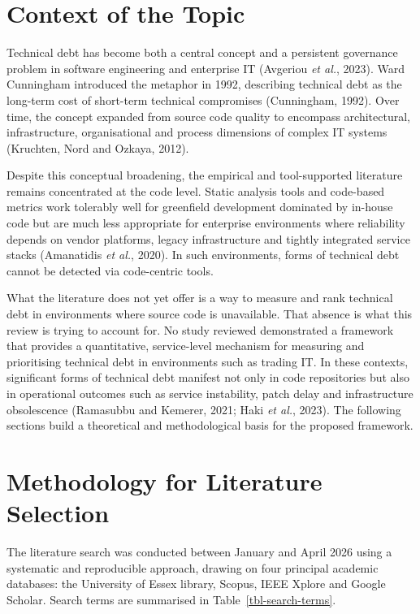 \documentclass[
  12pt,
  letterpaper,
  12pt,
  oneside,
  english,
  onehalfspacing,
  headsepline]{MastersDoctoralThesis}
\begin{document}
\section{Context of the Topic}\label{context-of-the-topic}

Technical debt has become both a central concept and a persistent
governance problem in software engineering and enterprise IT (Avgeriou
\emph{et al.}, 2023). Ward Cunningham introduced the metaphor in 1992,
describing technical debt as the long-term cost of short-term technical
compromises (Cunningham, 1992). Over time, the concept expanded from
source code quality to encompass architectural, infrastructure,
organisational and process dimensions of complex IT systems (Kruchten,
Nord and Ozkaya, 2012).

Despite this conceptual broadening, the empirical and tool-supported
literature remains concentrated at the code level. Static analysis tools
and code-based metrics work tolerably well for greenfield development
dominated by in-house code but are much less appropriate for enterprise
environments where reliability depends on vendor platforms, legacy
infrastructure and tightly integrated service stacks (Amanatidis
\emph{et al.}, 2020). In such environments, forms of technical debt
cannot be detected via code-centric tools.

What the literature does not yet offer is a way to measure and rank
technical debt in environments where source code is unavailable. That
absence is what this review is trying to account for. No study reviewed
demonstrated a framework that provides a quantitative, service-level
mechanism for measuring and prioritising technical debt in environments
such as trading IT. In these contexts, significant forms of technical
debt manifest not only in code repositories but also in operational
outcomes such as service instability, patch delay and infrastructure
obsolescence (Ramasubbu and Kemerer, 2021; Haki \emph{et al.}, 2023).
The following sections build a theoretical and methodological basis for
the proposed framework.

\section{Methodology for Literature
Selection}\label{methodology-for-literature-selection}

The literature search was conducted between January and April 2026 using
a systematic and reproducible approach, drawing on four principal
academic databases: the University of Essex library, Scopus, IEEE Xplore
and Google Scholar. Search terms are summarised in
Table~\ref{tbl-search-terms}.
\end{document}
